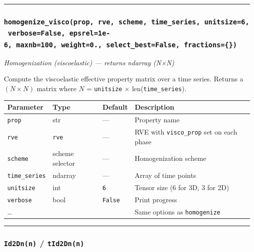 \documentclass[
  a4paper,
  numbers=noendperiod,
  DIV=12]{scrreprt}
\newcounter{none} %
\begin{document}
\begin{center}\rule{0.5\linewidth}{0.5pt}\end{center}

\subsubsection{\texorpdfstring{\texttt{homogenize\_visco(prop,\ rve,\ scheme,\ time\_series,\ unitsize=6,\ verbose=False,\ epsrel=1e-6,\ maxnb=100,\ weight=0.,\ select\_best=False,\ fractions=\{\})}}{homogenize\_visco(prop, rve, scheme, time\_series, unitsize=6, verbose=False, epsrel=1e-6, maxnb=100, weight=0., select\_best=False, fractions=\{\})}}\label{api-homogenize-visco}

\emph{Homogenization (viscoelastic) --- returns ndarray (N×N)}

Compute the viscoelastic effective property matrix over a time series.
Returns a \((N \times N)\) matrix where \(N\) = \texttt{unitsize} ×
len(\texttt{time\_series}).

{\def\LTcaptype{none} %
\begin{longtable}[]{@{}llll@{}}
\toprule\noalign{}
Parameter & Type & Default & Description \\
\midrule\noalign{}
\endhead
\bottomrule\noalign{}
\endlastfoot
\texttt{prop} & str & --- & Property name \\
\texttt{rve} & \texttt{rve} & --- & RVE with \texttt{visco\_prop} set on
each phase \\
\texttt{scheme} & scheme selector & --- & Homogenization scheme \\
\texttt{time\_series} & ndarray & --- & Array of time points \\
\texttt{unitsize} & int & \texttt{6} & Tensor size (6 for 3D, 3 for
2D) \\
\texttt{verbose} & bool & \texttt{False} & Print progress \\
\ldots{} & & & Same options as \texttt{homogenize} \\
\end{longtable}
}

\begin{center}\rule{0.5\linewidth}{0.5pt}\end{center}

\subsubsection{\texorpdfstring{\texttt{Id2Dn(n)} /
\texttt{tId2Dn(n)}}{Id2Dn(n) / tId2Dn(n)}}\label{api-id2dn}
\end{document}
